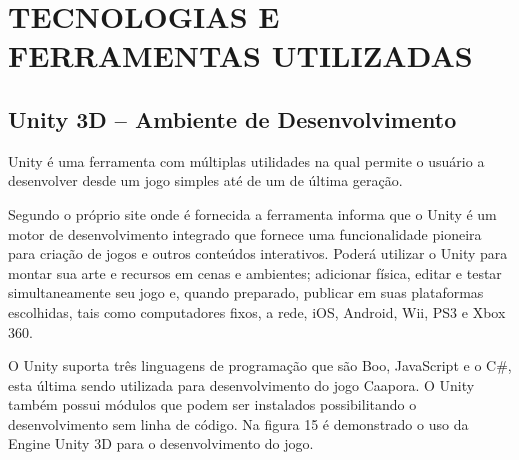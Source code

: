 \chapter{TECNOLOGIAS E FERRAMENTAS UTILIZADAS}
\label{cap:TECNOLOGIAS-E-FERRAMENTAS-UTILIZADAS}


\section{Unity 3D – Ambiente de Desenvolvimento}
\label{sec:Unity-3D---Ambiente-de-Desenvolvimento}

Unity é uma ferramenta com múltiplas utilidades na qual permite o usuário a desenvolver desde um jogo simples até de um de última geração.

Segundo o próprio site onde é fornecida a ferramenta informa que o Unity é um motor de desenvolvimento integrado que fornece uma funcionalidade pioneira para criação de jogos e outros conteúdos interativos. Poderá utilizar o Unity para montar sua arte e recursos em cenas e ambientes; adicionar física, editar e testar simultaneamente seu jogo e, quando preparado, publicar em suas plataformas escolhidas, tais como computadores fixos, a rede, iOS, Android, Wii, PS3 e Xbox 360. 

O Unity suporta três linguagens de programação que são Boo, JavaScript e o C\#, esta última sendo utilizada para desenvolvimento do jogo Caapora. O Unity também possui módulos que podem ser instalados possibilitando o desenvolvimento sem linha de código. \cite{unt}
Na figura 15 é demonstrado o uso da Engine Unity 3D para o desenvolvimento do jogo. 



	\begin{figure}[h!]
		\centering
	\end{figure}
	
